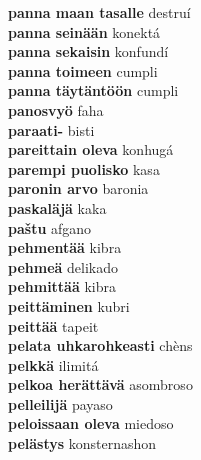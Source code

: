 \textbf{ panna maan tasalle  } destruí \\
\textbf{ panna seinään  } konektá \\
\textbf{ panna sekaisin  } konfundí \\
\textbf{ panna toimeen  } cumpli \\
\textbf{ panna täytäntöön  } cumpli \\
\textbf{ panosvyö  } faha \\
\textbf{ paraati-  } bisti \\
\textbf{ pareittain oleva  } konhugá \\
\textbf{ parempi puolisko  } kasa \\
\textbf{ paronin arvo  } baronia \\
\textbf{ paskaläjä  } kaka \\
\textbf{ paštu  } afgano \\
\textbf{ pehmentää  } kibra \\
\textbf{ pehmeä  } delikado \\
\textbf{ pehmittää  } kibra \\
\textbf{ peittäminen  } kubri \\
\textbf{ peittää  } tapeit \\
\textbf{ pelata uhkarohkeasti  } chèns \\
\textbf{ pelkkä  } ilimitá \\
\textbf{ pelkoa herättävä  } asombroso \\
\textbf{ pelleilijä  } payaso \\
\textbf{ peloissaan oleva  } miedoso \\
\textbf{ pelästys  } konsternashon \\
